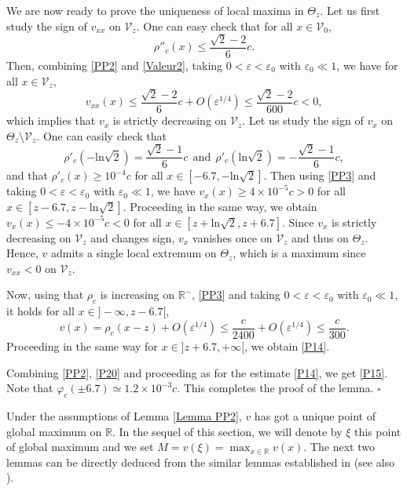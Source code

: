\documentclass[10pt,a4paper,twoside]{article}
\begin{document}
We are now ready to prove the uniqueness of local maxima in $ \Theta_z $.  Let us first study the sign of $v_{xx}$ on $\mathcal{V}_z$. One can easy check that for all $x\in\mathcal{V}_0$,
\begin{equation}\label{Valeur2}
\rho''_{c}(x)\le\frac{\sqrt{2}-2}{6}c.
\end{equation}
Then, combining \eqref{PP2} and \eqref{Valeur2}, taking $0<\varepsilon<\varepsilon_{0}$ with $\varepsilon_{0}\ll 1$, we have for all $x\in\mathcal{V}_z$,
\begin{equation*}
v_{xx}(x)\le\frac{\sqrt{2}-2}{6}c+O(\varepsilon^{1/4})
\le\frac{\sqrt{2}-2}{600}c<0,
\end{equation*}
which implies that $v_{x}$ is strictly decreasing on $\mathcal{V}_z$. Let us study the sign of $v_{x}$ on $\Theta_z\setminus\mathcal{V}_z$. One can easily check that 
\begin{equation}\label{Valeur1}
\rho'_{c}\left(-\text{ln}\sqrt{2}\right)
=\frac{\sqrt{2}-1}{6}c~~\text{and}~~
\rho'_{c}\left(\text{ln}\sqrt{2}\right)
=-\frac{\sqrt{2}-1}{6}c,
\end{equation}
and that $\rho'_{c}(x)\ge  10^{-4}c$ for all $x\in[-6.7,-\text{ln}\sqrt{2}]$. Then using \eqref{PP3} and taking $0<\varepsilon<\varepsilon_{0}$ with $\varepsilon_{0}\ll 1$, we have $v_{x}(x)\ge 4\times 10^{-5}c>0$ for all $x\in[z-6.7,z-\text{ln}\sqrt{2}]$. Proceeding in the same way, we obtain $v_{x}(x)\le -4\times 10^{-5}c<0$ for all $x\in[z+\text{ln}\sqrt{2},z+6.7]$. Since $v_{x}$ is strictly decreasing on $\mathcal{V}_z$ and changes sign,  $v_{x}$ vanishes once on $\mathcal{V}_z$ and thus on  $\Theta_z $. Hence,  $v$ admits a single local extremum on $\Theta_z$, which is a maximum since $v_{xx}<0$ on $\mathcal{V}_z$.

Now, using that $\rho_{c}$ is increasing on $\mathbb{R}^-$, \eqref{PP3} and taking $0<\varepsilon<\varepsilon_{0}$ with $\varepsilon_{0}\ll 1$, it holds for all $x\in]-\infty,z-6.7[$,
$$v(x)=\rho_{c}(x-z)+O(\varepsilon^{1/4})
\le\frac{c}{2400}+O(\varepsilon^{1/4})
\le\frac{c}{300}.$$
Proceeding in the same way for $x\in]z+6.7,+\infty[$, we obtain \eqref{P14}.

Combining \eqref{PP2}, \eqref{P20} and proceeding as for the estimate \eqref{P14}, we get 
\eqref{P15}. Note that $\varphi_{c}(\pm 6.7)\simeq 1.2 \times 10^{-3}c$. This completes the proof of the lemma. \hfill $ \square $ \vspace*{2mm}

Under the assumptions of Lemma \ref{Lemma PP2},  $v$ has got a unique point of global maximum on $\mathbb{R}$. In the sequel of this section, we will denote by $\xi$ this point of global maximum and we set
$M=v(\xi)=\max_{x\in\mathbb{R}}v(x)$. The next two lemmas can be directly deduced from the similar lemmas established in \cite{MR2460268} (see also  \cite{AK}).
\end{document}
